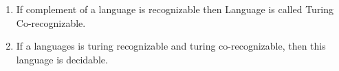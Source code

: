 \documentclass{article}
\begin{document}
\begin{enumerate}[1., leftmargin = 0.5cm]
    \item If complement of a language is recognizable then Language is called Turing Co-recognizable.

    \item If a languages is turing recognizable and turing co-recognizable, then this language is decidable.
\end{enumerate}
\end{document}

